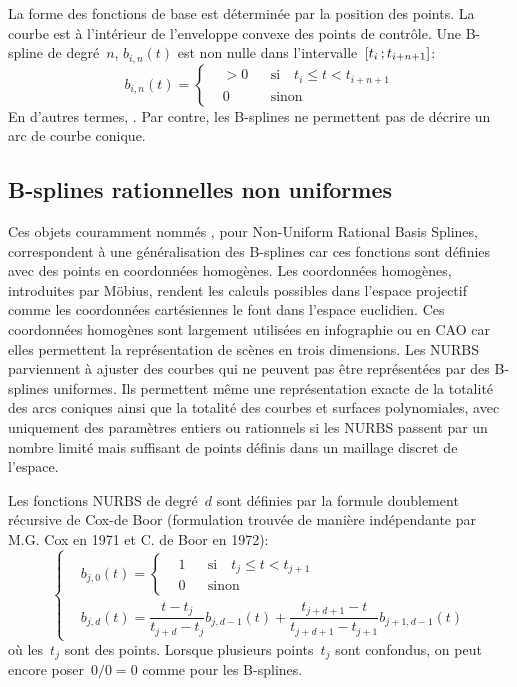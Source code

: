 La forme des fonctions de base est déterminée par la position des points. La courbe est à l'intérieur de l'enveloppe convexe des points de contrôle. Une B-spline de degré~$n$, $b_{i,n}(t)$ est non nulle dans l'intervalle~$\mathopen{[}t_i\,;t_{i+n+1}\mathclose{]}$: 
\begin{equation}
b_{i,n}(t) =\left\{\begin{aligned}
&>0 && \text{si} \quad t_{i} \leqslant t < t_{i+n+1} \\
&0 && \text{sinon} 
\end{aligned}\right. 
\end{equation}
En d'autres termes, . Par contre, les B-splines ne permettent pas de décrire un arc de courbe conique. 
\subsection{B-splines rationnelles non uniformes} 
Ces objets couramment nommés , pour Non-Uniform Rational Basis Splines, correspondent à une généralisation des B-splines car ces fonctions sont définies avec des points en coordonnées homogènes. Les coordonnées homogènes, introduites par Möbius, rendent les calculs possibles dans l'espace projectif comme les coordonnées cartésiennes le font dans l'espace euclidien. Ces coordonnées homogènes sont largement utilisées en infographie ou en CAO car elles permettent la représentation de scènes en trois dimensions. Les NURBS parviennent à ajuster des courbes qui ne peuvent pas être représentées par des B-splines uniformes. Ils permettent même une représentation exacte de la totalité des arcs coniques ainsi que la totalité des courbes et surfaces polynomiales, avec uniquement des paramètres entiers ou rationnels si les NURBS passent par un nombre limité mais suffisant de points définis dans un maillage discret de l'espace. 

Les fonctions NURBS de degré~$d$ sont définies par la formule doublement récursive de Cox-de Boor (formulation trouvée de manière indépendante par M.G. Cox en 1971 et C. de Boor en 1972): 
\begin{equation}
\left\{\begin{aligned}
&b_{j,0}(t)=
\left\{\begin{aligned}
& 1 && \text{si}\quad t_j \leq t < t_{j+1} \\
& 0 && \text{sinon} 
\end{aligned}\right.\\ 
&b_{j,d}(t)= \dfrac{t-t_j}{t_{j+d}-t_j} b_{j,d-1}(t)+\dfrac{t_{j+d+1}-t}{t_{j+d+1}-t_{j+1}}b_{j+1,d-1}(t)
\end{aligned}\right. 
\end{equation}
où les~$t_j$ sont des points. Lorsque plusieurs points~$t_j$ sont confondus, on peut encore poser~$0/0=0$ comme pour les B-splines. 